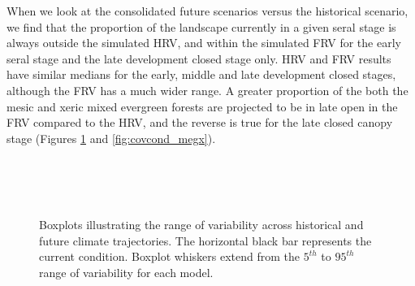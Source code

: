 When we look at the consolidated future scenarios versus the historical scenario, we find that the proportion of the landscape currently in a given seral stage is always outside the simulated HRV, and within the simulated FRV for the early seral stage and the late development closed stage only. HRV and FRV results have similar medians for the early, middle and late development closed stages, although the FRV has a much wider range. A greater proportion of the both the mesic and xeric mixed evergreen forests are projected to be in late open in the FRV compared to the HRV, and the reverse is true for the late closed canopy stage (Figures \ref{fig:covcond_megm} and \ref{fig:covcond_megx}).

\begin{figure}[htbp]
  \centering
   \\
   \\
       \\
    \caption{Boxplots illustrating the range of variability across historical and future climate trajectories. The horizontal black bar represents the current condition. Boxplot whiskers extend from the $5^{th}$ to $95^{th}$ range of variability for each model. }
  \label{fig:covcond_megm} %
\end{figure} %

